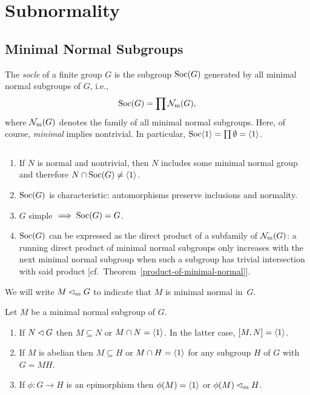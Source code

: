 \chapter{Subnormality}
\section{Minimal Normal Subgroups}

\begin{defn}\label{socle-defn}
    The \textsl{socle} of a finite group\/ $G$ is the subgroup ${\rm Soc}(G)$ generated by all minimal normal subgroups of\/ $G$, i.e.,
    $$
        {\rm Soc}(G) = \prod\operatorname{{\cal N}_m}(G),
    $$
    where\/ $\operatorname{{\cal N}_m}(G)$ denotes the family of all minimal normal subgroups. Here, of course, \textsl{minimal} implies nontrivial. In particular, ${\rm Soc}\langle1\rangle=\prod\emptyset=\langle1\rangle$.
\end{defn}

\begin{rems}\label{soc-intersection}${}$
    \begin{enumerate}[\rm i)]
        \item If $N$ is normal and nontrivial, then $N$ includes some minimal normal group and therefore $N\cap{\rm Soc}(G)\ne\langle1\rangle$.
        \item ${\rm Soc}(G)$ is characteristic\/\textrm{\rm: automorphisms preserve inclusions and normality.}
        \item $G$ simple $\implies{\rm Soc}(G) = G$.
        \item ${\rm Soc}(G)$ can be expressed as the direct product of a subfamily of\/ $\operatorname{{\cal N}_m}(G)$\textrm{\rm: a running direct product of minimal normal subgroups only increases with the next minimal normal subgroup when such a subgroup has trivial intersection with said product [cf.~Theorem~\ref{product-of-minimal-normal}].}
    \end{enumerate}
\end{rems}

\begin{ntn}
    We will write $M\lhd_m G$ to indicate that $M$ is minimal normal in~$G$.
\end{ntn}


\begin{prop}
    Let\/ $M$ be a minimal normal subgroup of\/ $G$.
    \begin{enumerate}[\rm a)]
        \item If\/ $N\lhd G$ then\/ $M \subseteq N$ or\/ $M \cap N = \langle1\rangle$. In the latter case, $[M, N] = \langle1\rangle$.
        \item If\/ $M$ is abelian then\/ $M \subseteq H$ or\/ $M \cap H = \langle1\rangle$ for any subgroup\/ $H$ of\/ $G$ with\/ $G = MH$.
        \item If\/ $\phi\colon G\to H$ is an epimorphism then\/ $\phi(M) = \langle1\rangle$ or\/ $\phi(M)\lhd_mH$.
    \end{enumerate}
\end{prop}

